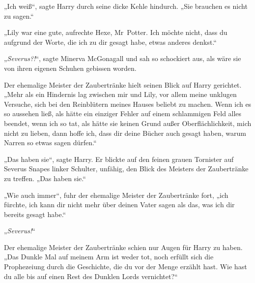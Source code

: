 „Ich weiß“, sagte Harry durch seine dicke Kehle hindurch.
„Sie brauchen es nicht zu sagen.“

„Lily war eine gute, aufrechte Hexe, Mr~Potter. Ich möchte nicht, dass du aufgrund der Worte, die ich zu dir gesagt habe, etwas anderes denkst.“

„\emph{Severus?!}“, sagte Minerva McGonagall und sah so schockiert aus, als wäre sie von ihren eigenen Schuhen gebissen worden.

Der ehemalige Meister der Zaubertränke hielt seinen Blick auf Harry gerichtet.
„Mehr als ein Hindernis lag zwischen mir und Lily, vor allem meine unklugen Versuche, sich bei den Reinblütern meines Hauses beliebt zu machen. Wenn ich es so aussehen ließ, als hätte ein einziger Fehler auf einem schlammigen Feld alles beendet, wenn ich so tat, als hätte sie keinen Grund außer Oberflächlichkeit, mich nicht zu lieben, dann hoffe ich, dass dir deine Bücher auch gesagt haben, warum Narren so etwas sagen dürfen.“

„Das haben sie“, sagte Harry. Er blickte auf den feinen grauen Tornister auf Severus Snapes linker Schulter, unfähig, den Blick des Meisters der Zaubertränke zu treffen.
„Das haben sie.“

„Wie auch immer“, fuhr der ehemalige Meister der Zaubertränke fort, „ich fürchte, ich kann dir nicht mehr über deinen Vater sagen als das, was ich dir bereits gesagt habe.“

„\emph{Severus!}“

Der ehemalige Meister der Zaubertränke schien nur Augen für Harry zu haben.
„Das Dunkle Mal auf meinem Arm ist weder tot, noch erfüllt sich die Prophezeiung durch die Geschichte, die du vor der Menge erzählt hast. Wie hast du alle bis auf einen Rest des Dunklen Lords vernichtet?“

